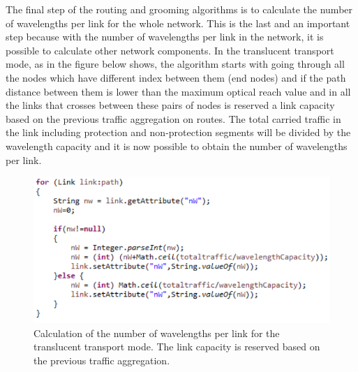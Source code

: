 \vspace{11pt}
The final step of the routing and grooming algorithms is to calculate the number of wavelengths per link for the whole network. This is the last and an important step because with the number of wavelengths per link in the network, it is possible to calculate other network components. In the translucent transport mode, as in the figure below shows, the algorithm starts with going through all the nodes which have different index between them (end nodes) and if the path distance between them is lower than the maximum optical reach value and in all the links that crosses between these pairs of nodes is reserved a link capacity based on the previous traffic aggregation on routes. The total carried traffic in the link including protection and non-protection segments will be divided by the wavelength capacity and it is now possible to obtain the number of wavelengths per link.

\begin{figure}[H]
\centering
\includegraphics[width=14cm]{sdf/heuristic/translucent_survivability/figures/grooming_translucent_surv3}
\caption{Calculation of the number of wavelengths per link for the translucent transport mode. The link capacity is reserved based on the previous traffic aggregation.}
\label{grooming_translucent_surv3}
\end{figure}

